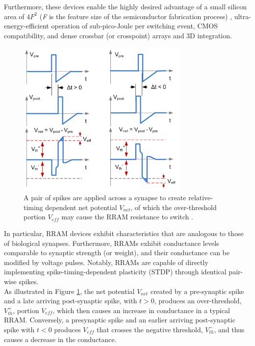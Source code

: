 \noindent  Furthermore, these devices enable the highly desired advantage of a small silicon area of $4F^2$ (\textit{F} is the feature size of the semiconductor fabrication process) \cite{chen2016review}, ultra-energy-efficient operation of sub-pico-Joule per switching event, CMOS compatibility, and dense crossbar (or crosspoint) arrays and 3D integration.\\

\begin{figure}[htbp!] 
\centering    
\includegraphics[width=0.75\textwidth]{Chapter4/Figs/4d.png}
\caption[A pair of spikes are applied across a synapse to create relative-timing dependent net potential.]{A pair of spikes are applied across a synapse to create relative-timing dependent net potential $V_{net}$, of which the over-threshold portion $V_{eff}$ may cause the RRAM resistance to switch \cite{wu2017enabling}.}
\label{fig:4d}
\end{figure}

\noindent In particular, RRAM devices exhibit characteristics that are analogous to those of biological synapses. Furthermore, RRAMs exhibit conductance levels comparable to synaptic strength (or weight), and their conductance can be modified by voltage pulses. Notably, RRAMs are capable of directly implementing spike-timing-dependent plasticity (STDP) through identical pair-wise spikes. \\

\noindent As illustrated in Figure \ref{fig:4d}, the net potential $V_{net}$ created by a pre-synaptic spike and a late arriving post-synaptic spike, with $t > 0$, produces an over-threshold, $V_{th}^+$, portion $V_{eff}$, which then causes an increase in conductance in a typical RRAM. Conversely, a presynaptic spike and an earlier arriving post-synaptic spike with $t < 0$ produces $V_{eff}$ that crosses the negative threshold, $V_{th}^-$, and thus causes a decrease in the conductance. \\

